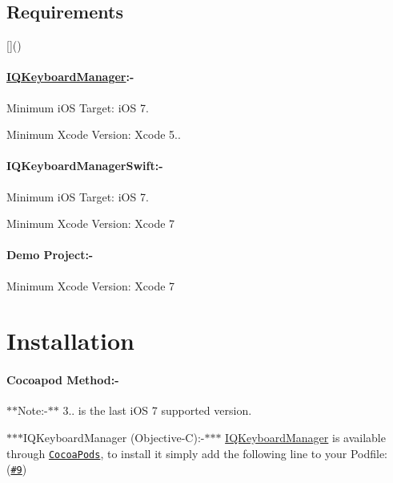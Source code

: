 \subsection*{Requirements}

\mbox{[}\mbox{]}()

\paragraph*{\mbox{\hyperlink{interface_i_q_keyboard_manager}{I\+Q\+Keyboard\+Manager}}\+:-\/}

\href{https://developer.apple.com/library/mac/documentation/Cocoa/Conceptual/ProgrammingWithObjectiveC/Introduction/Introduction.html}{\tt }

Minimum i\+OS Target\+: i\+OS 7.

Minimum Xcode Version\+: Xcode 5..

\paragraph*{I\+Q\+Keyboard\+Manager\+Swift\+:-\/}

\href{https://developer.apple.com/swift}{\tt }

Minimum i\+OS Target\+: i\+OS 7.

Minimum Xcode Version\+: Xcode 7

\paragraph*{Demo Project\+:-\/}

Minimum Xcode Version\+: Xcode 7

\section*{Installation }

\paragraph*{Cocoapod Method\+:-\/}

\href{http://cocoadocs.org/docsets/IQKeyboardManager}{\tt }

$\ast$$\ast$\+Note\+:-\/$\ast$$\ast$ 3.. is the last i\+OS 7 supported version.

$\ast$$\ast$$\ast$\+I\+Q\+Keyboard\+Manager (Objective-\/C)\+:-\/$\ast$$\ast$$\ast$ \mbox{\hyperlink{interface_i_q_keyboard_manager}{I\+Q\+Keyboard\+Manager}} is available through \href{http://cocoapods.org}{\tt Cocoa\+Pods}, to install it simply add the following line to your Podfile\+: (\href{https://github.com/hackiftekhar/IQKeyboardManager/issues/9}{\tt \#9})

